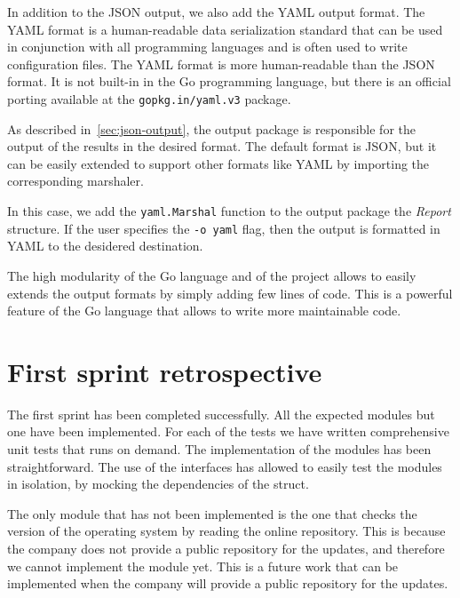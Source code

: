 In addition to the JSON output, we also add the YAML output format. The YAML format is a human-readable data serialization standard that can be used in conjunction with all programming languages and is often used to write configuration files. The YAML format is more human-readable than the JSON format. It is not built-in in the Go programming language, but there is an official porting available at the \texttt{gopkg.in/yaml.v3} package.

As described in~\cref{sec:json-output}, the output package is responsible for the output of the results in the desired format. The default format is JSON, but it can be easily extended to support other formats like YAML by importing the corresponding marshaler.

In this case, we add the \texttt{yaml.Marshal} function to the output package the \textit{Report} structure. If the user specifies the \texttt{-o yaml} flag, then the output is formatted in YAML to the desidered destination.

The high modularity of the Go language and of the project allows to easily extends the output formats by simply adding few lines of code. This is a powerful feature of the Go language that allows to write more maintainable code.

\section{First sprint retrospective}

The first sprint has been completed successfully. All the expected modules but one have been implemented. For each of the tests we have written comprehensive unit tests that runs on demand. The implementation of the modules has been straightforward. The use of the interfaces has allowed to easily test the modules in isolation, by mocking the dependencies of the struct.

The only module that has not been implemented is the one that checks the version of the operating system by reading the online repository. This is because the company does not provide a public repository for the updates, and therefore we cannot implement the module yet. This is a future work that can be implemented when the company will provide a public repository for the updates.


